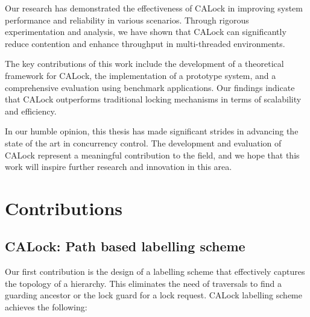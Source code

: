 Our research has demonstrated the effectiveness of CALock in improving system performance and reliability in various scenarios. Through rigorous experimentation and analysis, we have shown that CALock can significantly reduce contention and enhance throughput in multi-threaded environments.

The key contributions of this work include the development of a theoretical framework for CALock, the implementation of a prototype system, and a comprehensive evaluation using benchmark applications. Our findings indicate that CALock outperforms traditional locking mechanisms in terms of scalability and efficiency.


In our humble opinion, this thesis has made significant strides in advancing the state of the art in concurrency control. The development and evaluation of CALock represent a meaningful contribution to the field, and we hope that this work will inspire further research and innovation in this area.
\section{Contributions}

\subsection{CALock: Path based labelling scheme}
Our first contribution is the design of a labelling scheme that effectively captures the topology of a hierarchy. This eliminates the need of traversals to find a guarding ancestor or the lock guard for a lock request. CALock labelling scheme achieves the following: 

